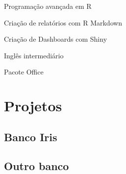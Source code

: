 \documentclass[
]{book}
\begin{document}
Programação avançada em R

Criação de relatórios com R Markdown

Criação de Dashboards com Shiny

Inglês intermediário

Pacote Office

\hypertarget{projetos}{%
\chapter{Projetos}\label{projetos}}

\hypertarget{banco-iris}{%
\section{Banco Iris}\label{banco-iris}}

\hypertarget{outro-banco}{%
\section{Outro banco}\label{outro-banco}}

  
\end{document}
